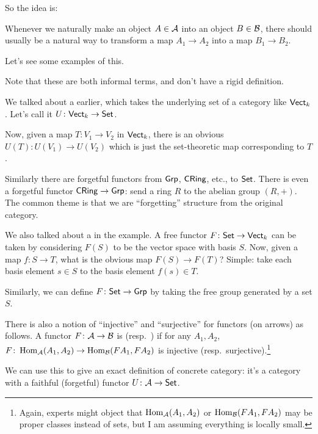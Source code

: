 So the idea is:
\begin{moral}
Whenever we naturally make an object $A \in \AA$ into an object $B \in \BB$,
there should usually be a natural way to transform a map $A_1 \to A_2$ into a map $B_1 \to B_2$.
\end{moral}
Let's see some examples of this.

\begin{example}
	Note that these are both informal terms,
	and don't have a rigid definition.
	\begin{enumerate}[(a)]
		\ii We talked about a  earlier,
		which takes the underlying set of a category like $\catname{Vect}_k$.
		Let's call it $U \colon \catname{Vect}_k \to \catname{Set}$.

		Now, given a map $T \colon V_1 \to V_2$ in $\catname{Vect}_k$,
		there is an obvious $U(T) \colon U(V_1) \to U(V_2)$ which is just
		the set-theoretic map corresponding to $T$.

		Similarly there are forgetful functors from
		$\catname{Grp}$, $\catname{CRing}$, etc., to $\catname{Set}$.
		There is even a forgetful functor $\catname{CRing} \to \catname{Grp}$:
		send a ring $R$ to the abelian group $(R,+)$.
		The common theme is that we are ``forgetting'' structure
		from the original category.

		\ii We also talked about a  in the example.
		A free functor $F \colon \catname{Set} \to \catname{Vect}_k$ can be taken by considering
		$F(S)$ to be the vector space with basis $S$.
		Now, given a map $f \colon S \to T$, what is the obvious map $F(S) \to F(T)$?
		Simple: take each basis element $s \in S$ to the basis element $f(s) \in T$.

		Similarly, we can define $F \colon \catname{Set} \to \catname{Grp}$
		by taking the free group generated by a set $S$.
	\end{enumerate}
\end{example}

\begin{remark}
	\label{remark:def_concrete_category}
	There is also a notion of ``injective'' and ``surjective''
	for functors (on arrows) as follows.
	A functor $F \colon \AA \to \BB$ is 
	(resp.\ ) if for any $A_1, A_2$,
	$F \colon \Hom_\AA(A_1, A_2) \to \Hom_\BB(FA_1, FA_2)$
	is injective (resp.\ surjective).\footnote{Again,
		experts might object that $\Hom_\AA(A_1, A_2)$
		or $\Hom_\BB(FA_1, FA_2)$ may be proper classes instead of sets,
		but I am assuming everything is locally small.}

	We can use this to give an exact definition of concrete category:
	it's a category with a faithful (forgetful) functor
	$U \colon \AA \to \catname{Set}$.
\end{remark}

